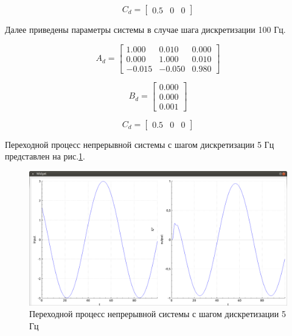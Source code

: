 \documentclass[14pt,a4paper]{extreport}
\begin{document}
\begin{equation}
    C_{d} = 
    \begin{bmatrix} 
        0.5 & 0 & 0
    \end{bmatrix}
\end{equation}

Далее приведены параметры системы в случае шага дискретизации 100 Гц.

\begin{equation}
    A_{d} = 
    \begin{bmatrix} 
        1.000 & 0.010 & 0.000 \\ 
        0.000 & 1.000 & 0.010 \\
        -0.015 & -0.050 & 0.980
    \end{bmatrix}
\end{equation}

\begin{equation}
    B_{d} = 
    \begin{bmatrix} 
        0.000 \\ 
        0.000 \\
        0.001
    \end{bmatrix}
\end{equation}

\begin{equation}
    C_{d} = 
    \begin{bmatrix} 
        0.5 & 0 & 0
    \end{bmatrix}
\end{equation}

Переходной процесс непрерывной системы с шагом дискретизации 
5 Гц представлен на рис.\ref{fig:con_5hz}.
\begin{figure}[H]
    \centering
    \includegraphics[width=160mm]{img/con_5hz.png}
    \caption{Переходной процесс непрерывной системы с шагом дискретизации 5 Гц}
    \label{fig:con_5hz}
\end{figure}
\end{document}
